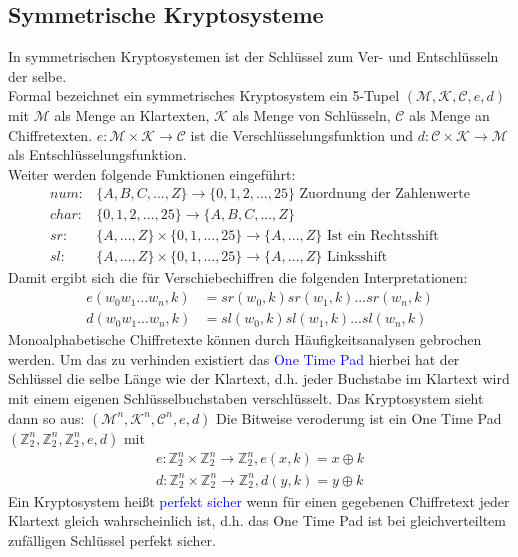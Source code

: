 \documentclass[a4paper,12pt]{article}
\newcommand{\blue}[1]{\textcolor{blue}{#1}}
\begin{document}
\subsection{Symmetrische Kryptosysteme}
In symmetrischen Kryptosystemen ist der Schlüssel zum Ver- und Entschlüsseln der selbe.\\
Formal bezeichnet ein symmetrisches Kryptosystem ein 5-Tupel $(\mathcal{M},\mathcal{K}, \mathcal{C},e,d)$ mit $\mathcal{M}$ als Menge an Klartexten, $\mathcal{K}$ als Menge von Schlüsseln, $\mathcal{C}$ als Menge an Chiffretexten.
$e: \mathcal{M}\times\mathcal{K}\rightarrow\mathcal{C}$ ist die Verschlüsselungsfunktion und $d: \mathcal{C}\times\mathcal{K}\rightarrow\mathcal{M}$ als Entschlüsselungsfunktion.\\
Weiter werden folgende Funktionen eingeführt:
\begin{align*}
num: & \{ A,B,C,...,Z\}\rightarrow\{ 0,1,2,...,25\} \textrm{ Zuordnung der Zahlenwerte}\\
char: & \{ 0,1,2,...,25\}\rightarrow\{ A,B,C,...,Z\}\\
sr: & \{A,...,Z\}\times\{0,1,...,25\}\rightarrow\{A,...,Z\} \textrm{ Ist ein Rechtsshift}\\
sl: & \{A,...,Z\}\times\{0,1,...,25\}\rightarrow\{A,...,Z\} \textrm{ Linksshift}
\end{align*}
Damit ergibt sich die für Verschiebechiffren die folgenden Interpretationen:
\begin{align*}
e(w_0w_1...w_n,k) &= sr(w_0,k)sr(w_1,k)...sr(w_n,k)\\
d(w_0w_1...w_n,k) &= sl(w_0,k)sl(w_1,k)...sl(w_n,k)
\end{align*}
Monoalphabetische Chiffretexte können durch Häufigkeitsanalysen gebrochen werden.
Um das zu verhinden existiert das \blue{One Time Pad} hierbei hat der Schlüssel die selbe Länge wie der Klartext, d.h. jeder Buchstabe im Klartext wird mit einem eigenen Schlüsselbuchstaben verschlüsselt. Das Kryptosystem sieht dann so aus: $(\mathcal{M}^n,\mathcal{K}^n, \mathcal{C}^n,e,d)$
Die Bitweise veroderung ist ein One Time Pad $(\mathbb{Z}_2^n,\mathbb{Z}_2^n,\mathbb{Z}_2^n,e,d)$ mit 
\begin{align*}
e:\mathbb{Z}_2^n\times\mathbb{Z}_2^n\rightarrow\mathbb{Z}_2^n,e(x,k)=x\oplus k\\
d:\mathbb{Z}_2^n\times\mathbb{Z}_2^n\rightarrow\mathbb{Z}_2^n,d(y,k)=y\oplus k
\end{align*}
Ein Kryptosystem heißt \blue{perfekt sicher} wenn für einen gegebenen Chiffretext jeder Klartext gleich wahrscheinlich ist, d.h. das One Time Pad ist bei gleichverteiltem zufälligen Schlüssel perfekt sicher.
\end{document}

